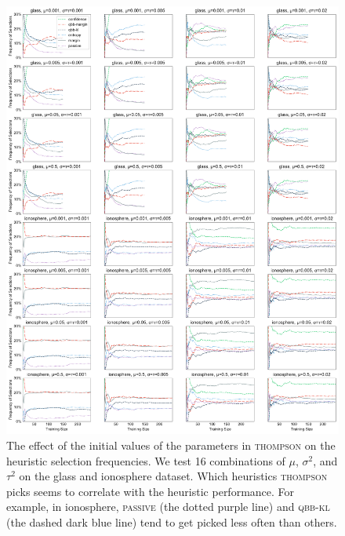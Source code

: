 \documentclass[fleqn,10pt,lineno]{wlpeerj} %
\begin{document}
\begin{figure}[tbp]
	\centering
	\includegraphics[width=\textwidth]{Fig11}
	\caption[Effect of hyperparameters on Thompson sampling on heuristic
	selection]{The effect of the initial values of the parameters in
	\textsc{thompson} on the heuristic selection frequencies. We test 16
	combinations of $\mu$, $\sigma^2$, and $\tau^2$ on the glass and ionosphere
	dataset. Which heuristics \textsc{thompson} picks seems to correlate with
	the heuristic performance. For example, in ionosphere, \textsc{passive}
	(the dotted purple line) and \textsc{qbb-kl} (the dashed dark blue line)
	tend to get picked less often than others.}
	\label{fig:selection-thompson-params}
\end{figure}
\end{document}
